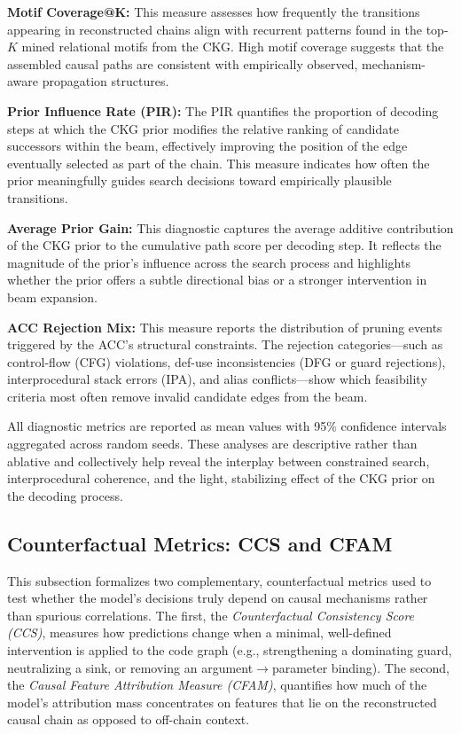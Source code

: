 \documentclass{buthesis}
\begin{document}
\textbf{Motif Coverage@K:}
This measure assesses how frequently the transitions appearing in reconstructed chains align with recurrent patterns found in the top-$K$ mined relational motifs from the CKG. High motif coverage suggests that the assembled causal paths are consistent with empirically observed, mechanism-aware propagation structures.

\textbf{Prior Influence Rate (PIR):}
The PIR quantifies the proportion of decoding steps at which the CKG prior modifies the relative ranking of candidate successors within the beam, effectively improving the position of the edge eventually selected as part of the chain. This measure indicates how often the prior meaningfully guides search decisions toward empirically plausible transitions.

\textbf{Average Prior Gain:}
This diagnostic captures the average additive contribution of the CKG prior to the cumulative path score per decoding step. It reflects the magnitude of the prior’s influence across the search process and highlights whether the prior offers a subtle directional bias or a stronger intervention in beam expansion.

\textbf{ACC Rejection Mix:}
This measure reports the distribution of pruning events triggered by the ACC’s structural constraints. The rejection categories—such as control-flow (CFG) violations, def-use inconsistencies (DFG or guard rejections), interprocedural stack errors (IPA), and alias conflicts—show which feasibility criteria most often remove invalid candidate edges from the beam.

All diagnostic metrics are reported as mean values with 95\% confidence intervals aggregated across random seeds. These analyses are descriptive rather than ablative and collectively help reveal the interplay between constrained search, interprocedural coherence, and the light, stabilizing effect of the CKG prior on the decoding process.



\subsection{Counterfactual Metrics: CCS and CFAM}
\label{sec:eval-cf-metrics}

This subsection formalizes two complementary, counterfactual metrics used to test whether the model’s decisions truly depend on causal mechanisms rather than spurious correlations. The first, the \emph{Counterfactual Consistency Score (CCS)}, measures how predictions change when a minimal, well-defined intervention is applied to the code graph (e.g., strengthening a dominating guard, neutralizing a sink, or removing an argument$\!\to$parameter binding). The second, the \emph{Causal Feature Attribution Measure (CFAM)}, quantifies how much of the model’s attribution mass concentrates on features that lie on the reconstructed causal chain as opposed to off-chain context.
\end{document}
